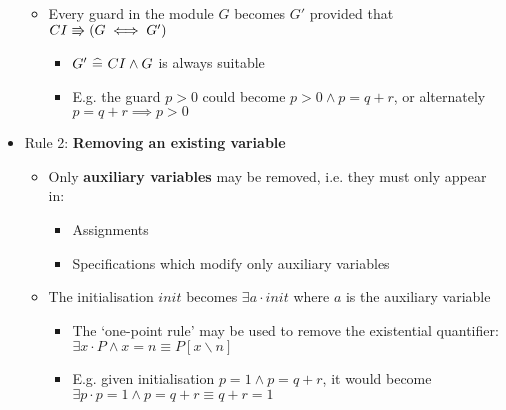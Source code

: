 \begin{itemize}
\begin{itemize}
\begin{itemize}
		\end{itemize}
		
		\item Every guard in the module $ G $ becomes $ G' $ provided that $ CI \Rrightarrow (G \iff G') $
		
		\begin{itemize}
			
			\item $ G' ~ \widehat{=} ~ CI \land G $ is always suitable
			
			\item E.g. the guard $ p > 0 $ could become $ p > 0 \land p = q + r $, or alternately $ p = q +r \implies p > 0 $
			
		\end{itemize}
		
	\end{itemize}
	
	\item Rule 2: \textbf{Removing an existing variable}
	
	\begin{itemize}
		
		\item Only \textbf{auxiliary variables} may be removed, i.e. they must only appear in:
		
		\begin{itemize}
			
			\item Assignments
			
			\item Specifications which modify only auxiliary variables
			
		\end{itemize}
	
		\item The initialisation $ init $ becomes $ \exists a \cdot init $ where $ a $ is the auxiliary variable
		
		\begin{itemize}
			
			\item The `one-point rule' may be used to remove the existential quantifier: $ \exists x \cdot P \land x = n \equiv P[x \backslash n] $
			
			\item E.g. given initialisation $ p = 1 \land p = q + r $, it would become $ \exists p \cdot p = 1 \land p = q + r \equiv q + r = 1 $
			
		\end{itemize}
	

\end{itemize}
\end{itemize}
